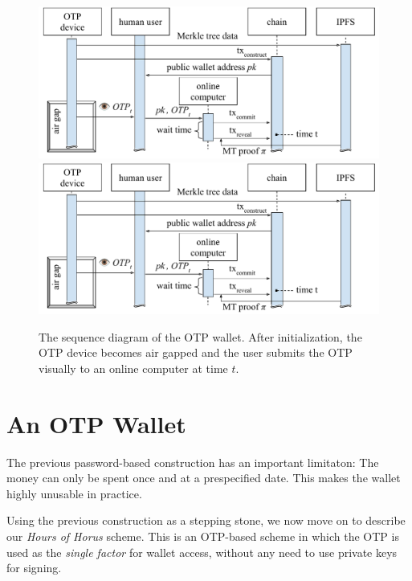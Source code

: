 \begin{figure}[ht]
    \caption{The sequence diagram of the OTP wallet. After initialization, the OTP device
             becomes air gapped and the user submits the OTP visually to an online computer
             at time $t$.}
    \centering
    \iflncs
        \includegraphics[width=\textwidth,keepaspectratio]{figures/otp-sequence-diagram.pdf}
    \else
        \includegraphics[width=0.7 \textwidth,keepaspectratio]{figures/otp-sequence-diagram.pdf}
    \fi
    \label{fig.sequence-diagram}
\end{figure}

\section{An OTP Wallet}

The previous password-based construction has an important limitaton:
The money can only be spent once and at a prespecified date. This makes
the wallet highly unusable in practice.

Using the previous construction as a stepping stone,
we now move on to describe our \emph{Hours of Horus} scheme.
This is an OTP-based scheme in which the OTP is used as the \emph{single factor}
for wallet access, without any need to use private keys for signing.

